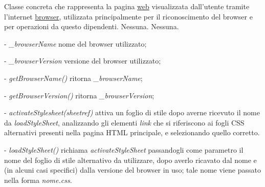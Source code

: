 Classe concreta che rappresenta la pagina \underline{web} visualizzata dall'utente tramite l'internet \underline{browser}, utilizzata principalmente per il riconoscimento del browser e per operazioni da questo dipendenti.
Nessuna.
Nessuna.
\begin{elencopuntato}[\subsubsecindent]
\item[-] \textit{{\_}browserName} nome del browser utilizzato;
\item[-] \textit{{\_}browserVersion} versione del browser utilizzato;
\end{elencopuntato}
\begin{elencopuntato}[\subsubsecindent]
\item[-] \textit{getBrowserName()} ritorna \textit{{\_}browserName};
\item[-] \textit{getBrowserVersion()} ritorna \textit{{\_}browserVersion};
\item[-] \textit{activateStylesheet(sheetref)} attiva un foglio di stile dopo averne ricevuto il nome da \textit{loadStyleSheet}, analizzando gli elementi \textit{link} che si riferiscono ai fogli CSS alternativi presenti nella pagina HTML principale, e selezionando quello corretto.  
\item[-] \textit{loadStyleSheet()} richiama \textit{activateStyleSheet} passandogli come parametro il nome del foglio di stile alternativo da utilizzare, dopo averlo ricavato dal nome e (in alcuni casi specifici) dalla versione del browser in uso; tale nome viene passato nella forma \textit{nome.css}.
\end{elencopuntato}

